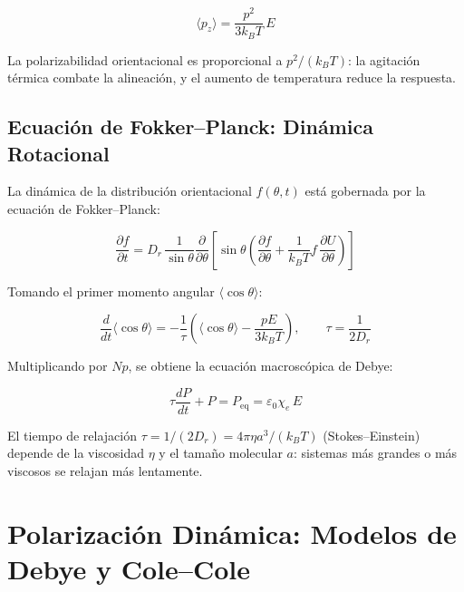 \documentclass[12pt]{article}
\begin{document}
\begin{equation}
\langle p_z\rangle = \frac{p^2}{3k_BT}\,E
\end{equation}

La polarizabilidad orientacional es proporcional a $p^2/(k_BT)$: la agitaci\'on t\'ermica
combate la alineaci\'on, y el aumento de temperatura reduce la respuesta.

\subsection{Ecuaci\'on de Fokker--Planck: Din\'amica Rotacional}

La din\'amica de la distribuci\'on orientacional $f(\theta,t)$ est\'a gobernada por la ecuaci\'on de
Fokker--Planck:

\begin{equation}
\frac{\partial f}{\partial t} =
D_r\,\frac{1}{\sin\theta}\frac{\partial}{\partial\theta}
\left[\sin\theta\left(
\frac{\partial f}{\partial\theta}
+ \frac{1}{k_BT}f\,\frac{\partial U}{\partial\theta}
\right)\right]
\end{equation}

Tomando el primer momento angular $\langle\cos\theta\rangle$:

\begin{equation}
\frac{d}{dt}\langle\cos\theta\rangle =
-\frac{1}{\tau}\left(\langle\cos\theta\rangle - \frac{pE}{3k_BT}\right),
\qquad \tau = \frac{1}{2D_r}
\end{equation}

Multiplicando por $Np$, se obtiene la ecuaci\'on macrosc\'opica de Debye:

\begin{equation}
\tau\frac{dP}{dt} + P = P_{\text{eq}} = \varepsilon_0\chi_e\,E
\end{equation}

El tiempo de relajaci\'on $\tau = 1/(2D_r) = 4\pi\eta a^3/(k_BT)$ (Stokes--Einstein) depende de la
viscosidad $\eta$ y el tama\~{n}o molecular $a$: sistemas m\'as grandes o m\'as viscosos
se relajan m\'as lentamente.


\section{Polarizaci\'on Din\'amica: Modelos de Debye y Cole--Cole}

\label{sec:debye}
\end{document}
